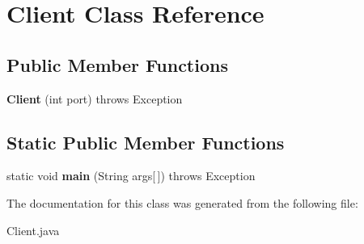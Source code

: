 \hypertarget{class_client}{}\section{Client Class Reference}
\label{class_client}
\subsection*{Public Member Functions}
\begin{DoxyCompactItemize}
\item 
\mbox{\label{class_client_a1862ab048047a5917b5e6a01bf38b78e}} 
{\bfseries Client} (int port)  throws Exception 
\end{DoxyCompactItemize}
\subsection*{Static Public Member Functions}
\begin{DoxyCompactItemize}
\item 
\mbox{\label{class_client_ac4219c51358857184ceeb023ada3d8ae}} 
static void {\bfseries main} (String args\mbox{[}$\,$\mbox{]})  throws Exception     
\end{DoxyCompactItemize}


The documentation for this class was generated from the following file\+:\begin{DoxyCompactItemize}
\item 
Client.\+java\end{DoxyCompactItemize}
